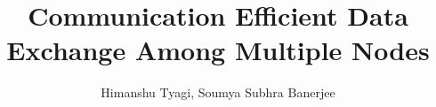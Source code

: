 \documentclass[final,hyperref={pdfpagelabels=false}]{beamer}
\title{\huge Communication Efficient Data Exchange Among Multiple Nodes} %
\author{Himanshu Tyagi, Soumya Subhra Banerjee} %
\institute{Indian Institute of Science} %
\begin{document}

\begin{frame}[t] %

\begin{columns}[t] %

\begin{column}{.02\textwidth}\end{column} %

\begin{column}{.465\textwidth} %


            

\end{column}
\end{columns}
\end{frame}
\end{document}
